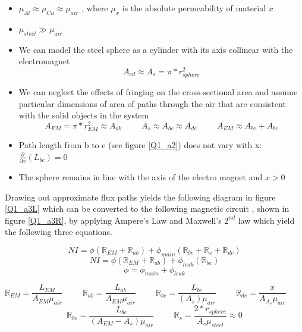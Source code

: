 \documentclass{article}
\theoremstyle{plain}
\theoremstyle{definition}
\theoremstyle{remark}
\begin{document}
\begin{itemize}
\item $ \mu_{Al} \approx \mu_{Cu} \approx \mu_{air} $ , where $\mu_x$ is the absolute permeability of material $x$
\item $ \mu_{steel} \gg \mu_{air} $
\item We can model the steel sphere as a cylinder with its axis collinear with the electromagnet  \\ 
$$A_{cd} \approx A_{s} = \pi * r_{sphere}^2 $$ 
\item We can neglect the effects of fringing on the cross-sectional area and assume particular dimensions of area of paths through the air that are consistent with the solid objects in the system \\
$$ A_{EM} = \pi*r_{EM}^2 \approx A_{ab} \hspace{1cm} A_{s} \approx A_{bc} \approx A_{de} \hspace{1cm} A_{EM} \approx A_{be} + A_{bc} $$ 
\item Path length from b to c (see figure \ref{Q1_a2}) does not vary with x: 
$ \frac{\partial}{\partial x} (L_{bc}) = 0$
\item The sphere remains in line with the axis of the electro magnet and $ x > 0$
\end{itemize}

Drawing out approximate flux paths yields the following diagram in figure \ref{Q1_a3L} which can be converted to the following magnetic circuit , shown in figure \ref{Q1_a3R}, by applying Ampere's Law and Maxwell's $2^{nd}$ law which yield the following three equations. 

$$ NI = \phi \left (\mathbb{R}_{EM} + \mathbb{R}_{ab}\right) + \phi_{main} \left( \mathbb{R}_{bc}+\mathbb{R}_{s}+\mathbb{R}_{dc} \right) $$
$$ NI = \phi \left( \mathbb{R}_{EM} + \mathbb{R}_{ab} \right) + \phi_{leak} \left( \mathbb{R}_{be} \right) $$
$$ \phi = \phi_{main} + \phi_{leak} $$


$$ \mathbb{R}_{EM} = \frac{L_{EM}}{A_{EM}\mu_{air}}  \hspace{1cm} \mathbb{R}_{ab} = \frac{L_{ab}}{A_{EM}\mu_{air}} \hspace{1cm} \mathbb{R}_{bc} = \frac{L_{bc}}{(A_{s})\mu_{air}} \hspace{1cm} \mathbb{R}_{de} = \frac{x}{A_{A_{s}}\mu_{air}} \hspace{1cm} $$ $$ \mathbb{R}_{be} = \frac{L_{be}}{(A_{EM} - A_{s})\mu_{air}}  \hspace{1cm}  \mathbb{R}_{s} = \frac{2*r_{sphere}}{A_{s}\mu_{steel}} \approx 0$$
\end{document}

